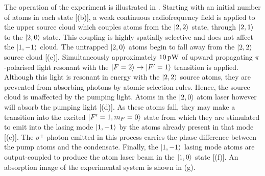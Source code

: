 The operation of the experiment is illustrated in .  Starting with an initial number of atoms in each state [(b)], a weak continuous radiofrequency field is applied to the upper source cloud which couples atoms from the ${\left|2, 2\right>}$ state, through ${\left|2, 1\right>}$ to the ${\left|2, 0\right>}$ state.  This coupling is highly spatially selective and does not affect the ${\left|1, -1\right>}$ cloud.  The untrapped ${\left|2, 0\right>}$ atoms begin to fall away from the ${\left|2, 2\right>}$ source cloud [(c)].  Simultaneously approximately $\unit[10]{pW}$ of upward propagating $\pi$-polarised light resonant with the ${\left|F=2\right>}\rightarrow{\ensuremath{\left|F'=1\right>}}$ transition is applied.  Although this light is resonant in energy with the ${\left|2, 2\right>}$ source atoms, they are prevented from absorbing photons by atomic selection rules.  Hence, the source cloud is unaffected by the pumping light.  Atoms in the ${\left|2, 0\right>}$ atom laser however will absorb the pumping light [(d)].  As these atoms fall, they may make a transition into the excited ${\left|F'=1, m_F=0\right>}$ state from which they are stimulated to emit into the lasing mode ${\left|1, -1\right>}$ by the atoms already present in that mode [(e)].  The $\sigma^{+}$-photon emitted in this process carries the phase difference between the pump atoms and the condensate.  Finally, the ${\left|1, -1\right>}$ lasing mode atoms are output-coupled to produce the atom laser beam in the ${\left|1, 0\right>}$ state [(f)].  An absorption image of the experimental system is shown in (g).


